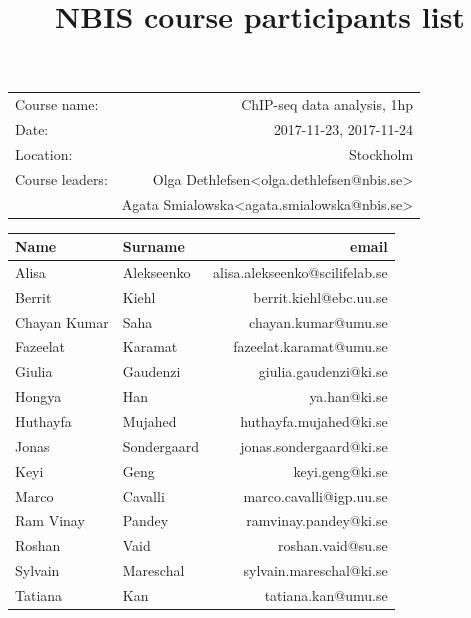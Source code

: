 \documentclass[12pt]{article}\usepackage[]{graphicx}\usepackage[]{color}
\makeatletter
\newcommand{\courseName}{ChIP-seq data analysis, 1hp}
\newcommand{\courseLocation}{Stockholm}
\newcommand{\courseDate}{2017-11-23, 2017-11-24}
\newcommand{\courseLeaderA}{Olga Dethlefsen}
\newcommand{\courseEmailA}{olga.dethlefsen@nbis.se}
\newcommand{\courseLeaderB}{Agata Smialowska}
\newcommand{\courseEmailB}{agata.smialowska@nbis.se}
\makeatother
\begin{document}
\pagestyle{fancy}



\title{NBIS course participants list}
\author{}
\maketitle
\thispagestyle{fancy}

\vspace{2cm}
\begin{center}
\begin{tabular}{l r}
Course name: & {\courseName} \\
Date: & {\courseDate} \\
Location: & {\courseLocation}  \\
Course leaders: & \courseLeaderA \textless{\courseEmailA}\textgreater\\
& \courseLeaderB  \textless{\courseEmailB}\textgreater
\end{tabular}
\end{center}

\newpage



\begin{table}[ht]
\centering
\begin{tabular}{llr}
  \toprule
Name & Surname & email \\ 
  \midrule
Alisa & Alekseenko & alisa.alekseenko@scilifelab.se \\ 
   \rowcolor[gray]{0.95}Berrit & Kiehl & berrit.kiehl@ebc.uu.se \\ 
  Chayan Kumar & Saha & chayan.kumar@umu.se \\ 
   \rowcolor[gray]{0.95}Fazeelat & Karamat & fazeelat.karamat@umu.se \\ 
  Giulia & Gaudenzi & giulia.gaudenzi@ki.se \\ 
   \rowcolor[gray]{0.95}Hongya & Han & ya.han@ki.se \\ 
  Huthayfa & Mujahed & huthayfa.mujahed@ki.se \\ 
   \rowcolor[gray]{0.95}Jonas & Sondergaard & jonas.sondergaard@ki.se \\ 
  Keyi & Geng & keyi.geng@ki.se \\ 
   \rowcolor[gray]{0.95}Marco & Cavalli & marco.cavalli@igp.uu.se \\ 
  Ram Vinay & Pandey & ramvinay.pandey@ki.se \\ 
   \rowcolor[gray]{0.95}Roshan & Vaid & roshan.vaid@su.se \\ 
  Sylvain & Mareschal & sylvain.mareschal@ki.se \\ 
   \rowcolor[gray]{0.95}Tatiana & Kan & tatiana.kan@umu.se \\ 
   \bottomrule
\end{tabular}
\end{table}
\end{document}
